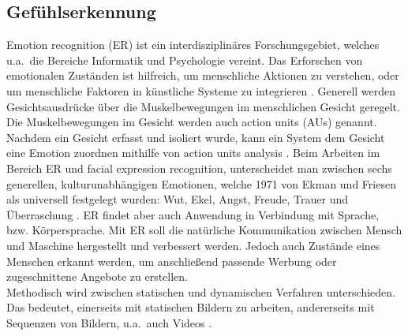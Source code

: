 \subsection{Gefühlserkennung}
Emotion recognition (ER) ist ein interdisziplinäres Forschungsgebiet, welches u.a.~die Bereiche Informatik und Psychologie vereint. Das Erforschen von emotionalen Zuständen ist hilfreich, um menschliche Aktionen zu verstehen, oder um menschliche Faktoren in künstliche Systeme zu integrieren \cite{eyetrackemotionrec}.
Generell werden Gesichtsausdrücke über die Muskelbewegungen im menschlichen Gesicht geregelt. Die Muskelbewegungen im Gesicht werden auch action units (AUs) genannt. Nachdem ein Gesicht erfasst und isoliert wurde, kann ein System dem Gesicht eine Emotion zuordnen mithilfe von action units analysis \cite{wildemotionrec}.
Beim Arbeiten im Bereich ER und facial expression recognition, unterscheidet man zwischen sechs generellen, kulturunabhängigen Emotionen, welche 1971 von Ekman und Friesen als universell festgelegt wurden: Wut, Ekel, Angst, Freude, Trauer und Überraschung \cite{cnnemotionrec}.
ER findet aber auch Anwendung in Verbindung mit Sprache, bzw. Körpersprache. Mit ER soll die natürliche Kommunikation zwischen Mensch und Maschine hergestellt und verbessert werden. Jedoch auch Zustände eines Menschen erkannt werden, um anschließend passende Werbung oder zugeschnittene Angebote zu erstellen.\\Methodisch wird zwischen statischen und dynamischen Verfahren unterschieden. Das bedeutet, einerseits mit statischen Bildern zu arbeiten, andererseits mit Sequenzen von Bildern, u.a.~auch Videos \cite{facialemotionrecusingcnn}.
\\
